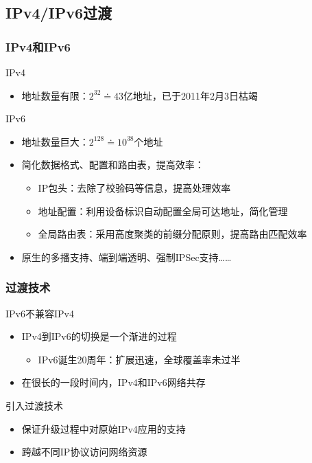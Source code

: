 \documentclass{beamer}
\begin{document}
\subsection{IPv4/IPv6过渡}
\begin{frame}
  \frametitle{IPv4和IPv6}

  \begin{block}{IPv4}
    \begin{itemize}
    \item 地址数量有限：$2^{32} \doteq 43$亿地址，已于2011年2月3日枯竭\footnotemark[1]
    \end{itemize}
  \end{block}

  \begin{block}{IPv6}
    \begin{itemize}
    \item 地址数量巨大：$2^{128} \doteq 10^{38}$个地址
    \item 简化数据格式、配置和路由表，提高效率：
      \begin{itemize}
      \item IP包头：去除了校验码等信息，提高处理效率
      \item 地址配置：利用设备标识自动配置全局可达地址，简化管理
      \item 全局路由表：采用高度聚类的前缀分配原则，提高路由匹配效率
      \end{itemize}
    \item 原生的多播支持、端到端透明、强制IPSec支持……
    \end{itemize}
  \end{block}
\end{frame}

\begin{frame}
  \frametitle{过渡技术}

  \begin{block}{IPv6不兼容IPv4}
    \begin{itemize}
    \item IPv4到IPv6的切换是一个渐进的过程
      \begin{itemize}
      \item IPv6诞生20周年：扩展迅速，全球覆盖率未过半\footnotemark[1]
      \end{itemize}
    \item 在很长的一段时间内，IPv4和IPv6网络共存
    \end{itemize}
  \end{block}
  \begin{block}{引入过渡技术}
    \begin{itemize}
    \item 保证升级过程中对原始IPv4应用的支持
    \item 跨越不同IP协议访问网络资源
    \end{itemize}
  \end{block}
\end{frame}
\end{document}

